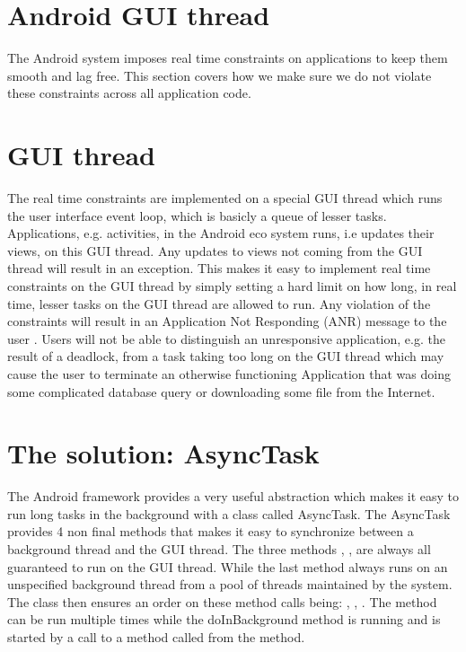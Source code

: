 
\section{Android GUI thread}
\label{sec:gui_thread_async_task}

The Android system imposes real time constraints on applications to keep them smooth and lag free. This section covers how we make sure we do not violate these constraints across all application code.

\section{GUI thread}
The real time constraints are implemented on a special GUI thread which runs the user interface event loop, which is basicly a queue of lesser tasks. Applications, e.g. activities, in the Android eco system runs, i.e updates their views, on this GUI thread. Any updates to views not coming from the GUI thread will result in an exception. This makes it easy to implement real time constraints on the GUI thread by simply setting a hard limit on how long, in real time, lesser tasks on the GUI thread are allowed to run. Any violation of the constraints will result in an Application Not Responding (ANR) message to the user \parencite{android_avoid_anr}. Users will not be able to distinguish an unresponsive application, e.g. the result of a deadlock, from a task taking too long on the GUI thread which may cause the user to terminate an otherwise functioning Application that was doing some complicated database query or downloading some file from the Internet. 

\section{The solution: AsyncTask}

The Android framework provides a very useful abstraction which makes it easy to run long tasks in the background with a class called AsyncTask. The AsyncTask provides 4 non final methods that makes it easy to synchronize between a background thread and the GUI thread. The three methods , ,  are always all guaranteed to run on the GUI thread. While the last method  always runs on an unspecified background thread from a pool of threads maintained by the system. The class then ensures an order on these method calls being: , , . The  method can be run multiple times while the doInBackground method is running and is started by a call to a method called  from the  method.  

